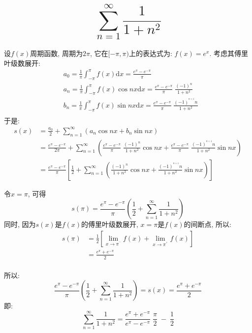 \documentclass{article}
\begin{document}
\section*{$$\sum_{n=1}^\infty {\frac{1}{1+n^2}}$$}

设$f(x)$周期函数, 周期为$2\pi$, 它在$[-\pi,\pi)$上的表达式为: $f(x) = e^x$. 考虑其傅里叶级数展开:\\
$$
\begin{aligned}
&a_0 = \frac{1}{\pi} \int_{-\pi}^{\pi} {f(x) \mathrm{d}x} =\frac{e^\pi - e^{-\pi}}{\pi} \\
&a_n = \frac{1}{\pi} \int_{-\pi}^{\pi} {f(x) \cos {nx} \mathrm{d}x} = 
\frac{e^\pi - e^{-\pi}}{\pi} \; \frac{(-1)^n}{1+n^2}\\
&b_n = \frac{1}{\pi} \int_{-\pi}^{\pi} {f(x) \sin {nx} \mathrm{d}x}= 
\frac{e^\pi - e^{-\pi}}{\pi} \; \frac{(-1)^{^{n+1}} n }{1+n^2}\\
\end{aligned}
$$
于是:
$$
\begin{aligned}
s(x) &= \frac{a_0}{2} + \sum_{n=1}^\infty  (a_n \cos{nx} + b_n \sin{nx})\\
&= \frac{e^\pi - e^{-\pi}}{2\pi} + \sum_{n=1}^\infty \left(
\frac{e^\pi - e^{-\pi}}{\pi} \; \frac{(-1)^n}{1+n^2} \cos{nx} + 
\frac{e^\pi - e^{-\pi}}{\pi} \; \frac{(-1)^{^{n+1}} n }{1+n^2} \sin{nx}\right)\\
 &= \frac{e^\pi -e^{-\pi}}{\pi} \left[\frac{1}{2} + \sum_{n=1}^\infty \left(\frac{(-1)^n}{1+n^2} \cos{nx} + 
 \frac{(-1)^{^{n+1}}n}{1+n^2} \sin{nx} \right)\right]
\end{aligned}
$$

令$x=\pi$, 可得
$$s(\pi) = \frac{e^\pi -e^{-\pi}}{\pi} \left(\frac{1}{2} + \sum_{n=1}^\infty \frac{1}{1+n^2}\right)$$
同时, 因为$s(x)$是$f(x)$的傅里叶级数展开, $x=\pi$是$f(x)$的间断点, 所以:
$$
\begin{aligned}
s(\pi)&= \frac{1}{2} \left[ \lim_{x \to \pi^{^-}} f(x) + \lim_{x \to \pi^{^+}} f(x) \right] \\
&= \frac{e^\pi + e^{-\pi}}{2}\\
\end{aligned}
$$

所以:
$$
\frac{e^\pi -e^{-\pi}}{\pi} \left(\frac{1}{2} + \sum_{n=1}^\infty \frac{1}{1+n^2}\right) = s(x) = 
\frac{e^\pi + e^{-\pi}}{2}
$$
即:
$$
\sum_{n=1}^\infty \frac{1}{1+n^2} = \frac{e^\pi + e^{-\pi}}{e^\pi - e^{-\pi}} \; \frac{\pi}{2} \; - \; \frac{1}{2}
$$
\end{document}
